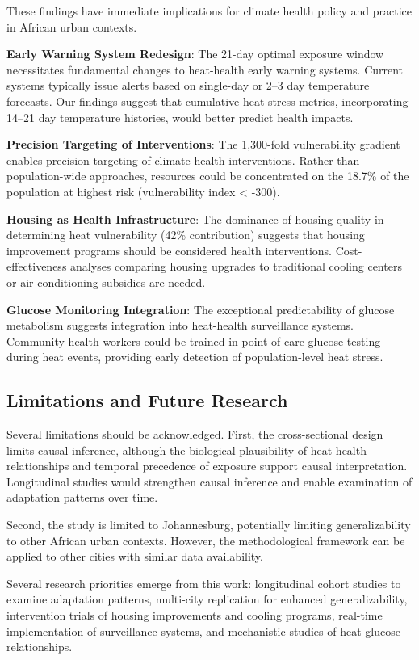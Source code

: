 \documentclass[11pt,a4paper]{article}
\begin{document}
These findings have immediate implications for climate health policy and practice in African urban contexts.

\textbf{Early Warning System Redesign}: The 21-day optimal exposure window necessitates fundamental changes to heat-health early warning systems. Current systems typically issue alerts based on single-day or 2--3 day temperature forecasts. Our findings suggest that cumulative heat stress metrics, incorporating 14--21 day temperature histories, would better predict health impacts.

\textbf{Precision Targeting of Interventions}: The 1,300-fold vulnerability gradient enables precision targeting of climate health interventions. Rather than population-wide approaches, resources could be concentrated on the 18.7\% of the population at highest risk (vulnerability index < -300).

\textbf{Housing as Health Infrastructure}: The dominance of housing quality in determining heat vulnerability (42\% contribution) suggests that housing improvement programs should be considered health interventions. Cost-effectiveness analyses comparing housing upgrades to traditional cooling centers or air conditioning subsidies are needed.

\textbf{Glucose Monitoring Integration}: The exceptional predictability of glucose metabolism suggests integration into heat-health surveillance systems. Community health workers could be trained in point-of-care glucose testing during heat events, providing early detection of population-level heat stress.

\subsection{Limitations and Future Research}

Several limitations should be acknowledged. First, the cross-sectional design limits causal inference, although the biological plausibility of heat-health relationships and temporal precedence of exposure support causal interpretation. Longitudinal studies would strengthen causal inference and enable examination of adaptation patterns over time.

Second, the study is limited to Johannesburg, potentially limiting generalizability to other African urban contexts. However, the methodological framework can be applied to other cities with similar data availability.

Several research priorities emerge from this work: longitudinal cohort studies to examine adaptation patterns, multi-city replication for enhanced generalizability, intervention trials of housing improvements and cooling programs, real-time implementation of surveillance systems, and mechanistic studies of heat-glucose relationships.
\end{document}
